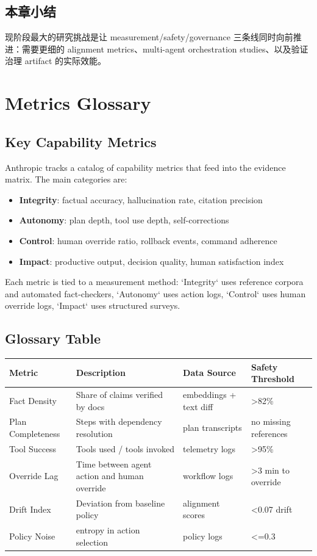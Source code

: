 \documentclass[a4paper]{article}
\begin{document}
\subsection{本章小结}

现阶段最大的研究挑战是让 measurement/safety/governance 三条线同时向前推进：需要更细的 alignment metrics、multi-agent orchestration studies、以及验证治理 artifact 的实际效能。

\section{Metrics Glossary}

\subsection{Key Capability Metrics}

Anthropic tracks a catalog of capability metrics that feed into the evidence matrix. The main categories are:

\begin{itemize}
    \item \textbf{Integrity}: factual accuracy, hallucination rate, citation precision
    \item \textbf{Autonomy}: plan depth, tool use depth, self-corrections
    \item \textbf{Control}: human override ratio, rollback events, command adherence
    \item \textbf{Impact}: productive output, decision quality, human satisfaction index
\end{itemize}

Each metric is tied to a measurement method: `Integrity` uses reference corpora and automated fact-checkers, `Autonomy` uses action logs, `Control` uses human override logs, `Impact` uses structured surveys.

\subsection{Glossary Table}

\begin{tabular}{p{}p{}p{}p{}}
\toprule
Metric & Description & Data Source & Safety Threshold \\
\midrule
Fact Density & Share of claims verified by docs & embeddings + text diff & >82\% \\
Plan Completeness & Steps with dependency resolution & plan transcripts & no missing references \\
Tool Success & Tools used / tools invoked & telemetry logs & >95\% \\
Override Lag & Time between agent action and human override & workflow logs & >3 min to override \\
Drift Index & Deviation from baseline policy & alignment scores & <0.07 drift \\
Policy Noise & entropy in action selection & policy logs & <=0.3 \\
\bottomrule
\end{tabular}
\end{document}
